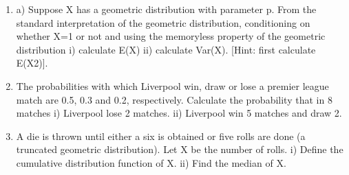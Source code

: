 \documentclass[]{report}
\begin{document}
\begin{enumerate}
\item	a) Suppose X has a geometric distribution with parameter p. From the standard interpretation of the geometric distribution, conditioning on whether X=1 or not and using the memoryless property of the geometric distribution
	i)	calculate E(X)
	ii)	calculate Var(X). [Hint: first calculate E(X2)].
	
\item	The probabilities with which Liverpool win, draw or lose a premier league match are 0.5, 0.3 and 0.2, respectively. Calculate the probability that in 8 matches
	i)	Liverpool lose 2 matches.
	ii)	Liverpool win 5 matches and draw 2.
	
\item	A die is thrown until either a six is obtained or five rolls are done (a truncated geometric distribution). Let X be the number of rolls.
	i)	Define the cumulative distribution function of X.
	ii)	Find the median of X.

\end{enumerate}
\newpage	
	
\end{document}
